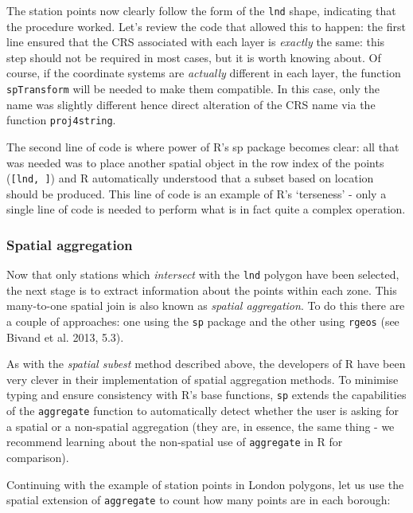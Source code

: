 \documentclass[]{article}
\begin{document}
The station points now clearly follow the form of the \texttt{lnd}
shape, indicating that the procedure worked. Let's review the code that
allowed this to happen: the first line ensured that the CRS associated
with each layer is \emph{exactly} the same: this step should not be
required in most cases, but it is worth knowing about. Of course, if the
coordinate systems are \emph{actually} different in each layer, the
function \texttt{spTransform} will be needed to make them compatible. In
this case, only the name was slightly different hence direct alteration
of the CRS name via the function \texttt{proj4string}.

The second line of code is where power of R's sp package becomes clear:
all that was needed was to place another spatial object in the row index
of the points (\texttt{{[}lnd, {]}}) and R automatically understood that
a subset based on location should be produced. This line of code is an
example of R's `terseness' - only a single line of code is needed to
perform what is in fact quite a complex operation.

\subsubsection{Spatial aggregation}

Now that only stations which \emph{intersect} with the \texttt{lnd}
polygon have been selected, the next stage is to extract information
about the points within each zone. This many-to-one spatial join is also
known as \emph{spatial aggregation}. To do this there are a couple of
approaches: one using the \texttt{sp} package and the other using
\texttt{rgeos} (see Bivand et al. 2013, 5.3).

As with the \emph{spatial subest} method described above, the developers
of R have been very clever in their implementation of spatial
aggregation methods. To minimise typing and ensure consistency with R's
base functions, \texttt{sp} extends the capabilities of the
\texttt{aggregate} function to automatically detect whether the user is
asking for a spatial or a non-spatial aggregation (they are, in essence,
the same thing - we recommend learning about the non-spatial use of
\texttt{aggregate} in R for comparison).

Continuing with the example of station points in London polygons, let us
use the spatial extension of \texttt{aggregate} to count how many points
are in each borough:
\end{document}
